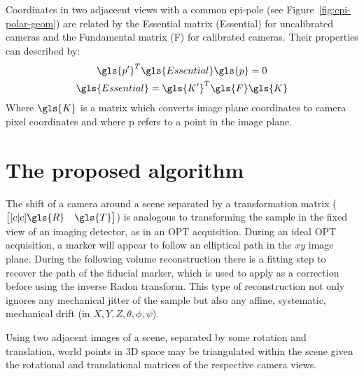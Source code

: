 \documentclass{osa-article}
\begin{document}



Coordinates in two adjaceent views with a common epi-pole (see Figure~\ref{fig:epi-polar-geom}) are related by the Essential matrix (\gls{Essential}) for uncalibrated cameras and the Fundamental matrix (\gls{F}) for calibrated cameras.
Their properties can described by:
\begin{gather}
\gls{p'}^T \gls{Essential} \gls{p} = 0 \label{eq:pEp}\\
\gls{Essential} = \gls{K'}^T \gls{F} \gls{K} %
\end{gather}
Where \(\gls{K}\) is a matrix which converts image plane coordinates to camera pixel coordinates and where \gls{p} refers to a point in the image plane.

\section{The proposed algorithm}

The shift of a camera around a scene separated by a transformation matrix (\( \begin{bmatrix}[c|c] \gls{R} & \gls{T} \end{bmatrix}\)) is analogous to transforming the sample in the fixed view of an imaging detector, as in an \gls{OPT} acquisition. %
During an ideal \gls{OPT} acquisition, a marker will appear to follow an elliptical path in the \(xy\) image plane.
During the following volume reconstruction there is a fitting step to recover the path of the fiducial marker, which is used to apply as a correction before using the inverse \gls{Radon transform}.
This type of reconstruction not only ignores any mechanical jitter of the sample but also any affine, systematic, mechanical drift (in \(X,Y,Z,\theta,\phi,\psi \)). %

Using two adjacent images of a scene, separated by some rotation and translation, world points in 3D space may be triangulated within the scene given the rotational and translational matrices of the respective camera views.

\end{document}

